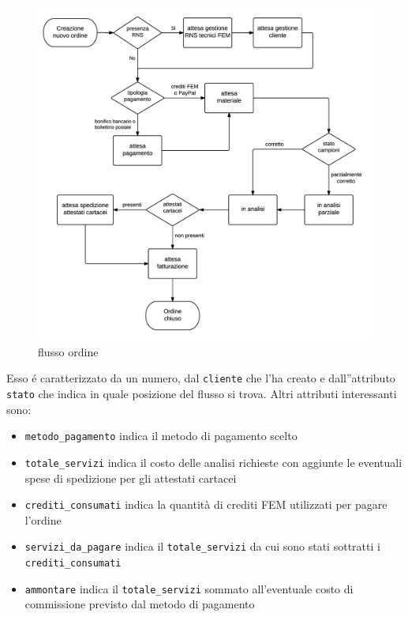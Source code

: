 \begin{figure}
 \includegraphics[width=1\textwidth]{images/flusso-ordine} 
 \caption{flusso ordine}
 \label{fig:flusso-ordine}
\end{figure}

Esso é caratterizzato da un numero, dal \texttt{cliente} che l'ha creato e dall''attributo \texttt{stato} che indica in quale posizione del flusso si trova.
Altri attributi interessanti sono:
\begin{itemize}
 \item \texttt{metodo\_pagamento} indica il metodo di pagamento scelto
 \item \texttt{totale\_servizi} indica il costo delle analisi richieste con aggiunte le eventuali spese di spedizione per gli attestati cartacei 
 \item \texttt{crediti\_consumati} indica la quantità di crediti FEM utilizzati per pagare l'ordine
 \item \texttt{servizi\_da\_pagare} indica il  \texttt{totale\_servizi} da cui sono stati sottratti i \texttt{crediti\_consumati}
 \item \texttt{ammontare} indica il \texttt{totale\_servizi} sommato all'eventuale costo di commissione previsto dal metodo di pagamento
\end{itemize}


